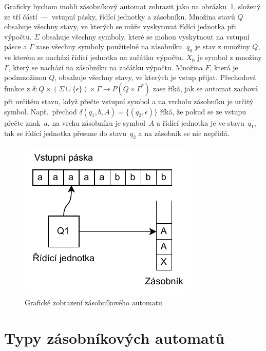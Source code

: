 Graficky bychom mohli zásobníkový automat zobrazit jako na obrázku~\ref{fig:PDAComponents}, složený ze tří částí~---~vstupní pásky, řídící jednotky a zásobníku. Množina stavů $Q$ obsahuje všechny stavy, ve kterých se může vyskytovat řídící jednotka při výpočtu. $\Sigma$ obsahuje všechny symboly, které se mohou vyskytnout na vstupní pásce a $\Gamma$ zase všechny symboly použitelné na zásobníku. $q_0$ je stav z množiny $Q$, ve kterém se nachází řídící jednotka na začátku výpočtu. $X_0$ je symbol z množiny $\Gamma$, který se nachází na zásobníku na začátku výpočtu. Množina $F$, která je podmnožinou $Q$, obsahuje všechny stavy, ve kterých je vstup přijat. Přechodová funkce z $\delta : Q \times (\Sigma \cup \{\epsilon\}) \times \Gamma \rightarrow P(Q \times \Gamma^*)$ zase říká, jak se automat zachová při určitém stavu, když přečte vstupní symbol a na vrcholu zásobníku je určitý symbol. Např.\ přechod $\delta(q_1,b,A) = \{(q_2,\epsilon)\}$ říká, že pokud se ze vstupu přečte znak~$a$, na vrchu zásobníku je symbol~$A$ a řídící jednotka je ve stavu~$q_1$, tak se řídící jednotka přesune do stavu~$q_2$ a na zásobník se nic nepřidá.

\begin{figure}[h]
    \centering
    \includegraphics{Figures/PDAComponents.drawio.pdf}
    \caption{Grafické zobrazení zásobníkového automatu}\label{fig:PDAComponents}
\end{figure}

\section{Typy zásobníkových automatů}\label{sec:TypesOfPDA}

